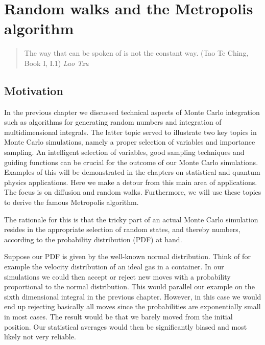 


\chapter{Random walks and the Metropolis algorithm}\label{chap:mcrandom} 
\begin{quotation}
 The way that can be spoken of is not the  constant way. (Tao Te Ching, Book I, I.1) {\em Lao Tzu}
\end{quotation}

\section{Motivation}
In the previous chapter we discussed technical aspects of Monte Carlo integration
such as algorithms for generating random numbers and integration of multidimensional 
integrals.
The latter topic served to illustrate two key topics in Monte Carlo simulations,
namely a proper selection of variables and importance sampling. An intelligent selection
of variables, good sampling techniques 
and guiding functions can be crucial for the outcome of our Monte Carlo simulations.
Examples of this will be demonstrated in the chapters on statistical and quantum physics
applications. Here we make a detour from this main area of applications. The focus
is on diffusion and random walks. Furthermore, we will use these topics to derive the famous Metropolis algorithm.

The rationale for this is that the tricky part of an actual Monte Carlo simulation 
resides in the appropriate selection of random states, and thereby numbers, 
according to the probability distribution (PDF)
at hand. 

Suppose our PDF is given by the well-known normal distribution. Think of for
example the velocity distribution of an  ideal gas in a container. In our simulations we
could then  accept or reject new moves with a probability proportional to
the normal distribution. This would parallel our example on the sixth dimensional
integral in the previous chapter. However, in this case we would end up rejecting basically
all moves since the probabilities are exponentially small in most cases. The result would
be that we barely moved from the initial position. Our statistical averages would then
be significantly biased and most likely not very reliable. 

